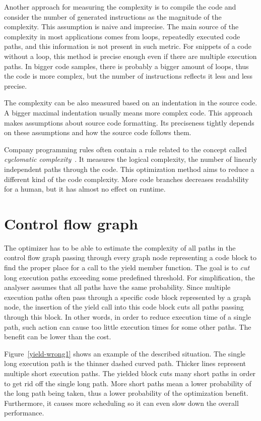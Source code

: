 Another approach for measuring the complexity is to compile the code and consider the number of generated instructions as the magnitude of the complexity. This assumption is naive and imprecise. The main source of the complexity in most applications comes from loops, repeatedly executed code paths, and this information is not present in such metric. For snippets of a code without a loop, this method is precise enough even if there are multiple execution paths. In bigger code samples, there is probably a bigger amount of loops, thus the code is more complex, but the number of instructions reflects it less and less precise.

The complexity can be also measured based on an indentation in the source code. A bigger maximal indentation usually means more complex code. This approach makes assumptions about source code formatting. Its preciseness tightly depends on these assumptions and how the source code follows them.

Company programming rules often contain a rule related to the concept called \emph{cyclomatic complexity}~\cite{cyclomatic-complexity}. It measures the logical complexity, the number of linearly independent paths through the code. This optimization method aims to reduce a different kind of the code complexity. More code branches decreases readability for a human, but it has almost no effect on runtime.

\section{Control flow graph}
\label{yield-cfg}
The optimizer has to be able to estimate the complexity of all paths in the control flow graph passing through every graph node representing a code block to find the proper place for a call to the yield member function. The goal is to \textit{cut} long execution paths exceeding some predefined threshold. For simplification, the analyser assumes that all paths have the same probability. Since multiple execution paths often pass through a specific code block represented by a graph node, the insertion of the yield call into this code block cuts all paths passing through this block. In other words, in order to reduce execution time of a single path, such action can cause too little execution times for some other paths. The benefit can be lower than the cost.

Figure~\ref{yield-wrong1} shows an example of the described situation. The single long execution path is the thinner dashed curved path. Thicker lines represent multiple short execution paths. The yielded block cuts many short paths in order to get rid off the single long path. More short paths mean a lower probability of the long path being taken, thus a lower probability of the optimization benefit. Furthermore, it causes more scheduling so it can even slow down the overall performance.

